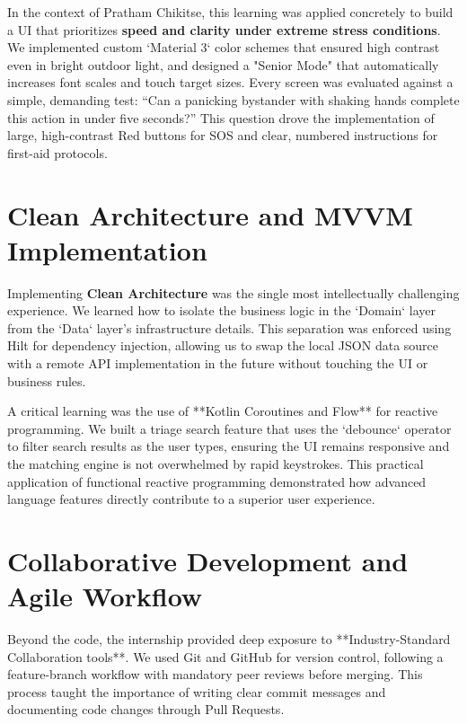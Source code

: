 \documentclass[12pt,a4paper]{report}
\begin{document}
\vspace{0.4cm}

In the context of Pratham Chikitse, this learning was applied concretely to build a UI that prioritizes \textbf{speed and clarity under extreme stress conditions}. We implemented custom `Material 3` color schemes that ensured high contrast even in bright outdoor light, and designed a "Senior Mode" that automatically increases font scales and touch target sizes. Every screen was evaluated against a simple, demanding test: ``Can a panicking bystander with shaking hands complete this action in under five seconds?'' This question drove the implementation of large, high-contrast Red buttons for SOS and clear, numbered instructions for first-aid protocols.

\section{Clean Architecture and MVVM Implementation}

Implementing \textbf{Clean Architecture} was the single most intellectually challenging experience. We learned how to isolate the business logic in the `Domain` layer from the `Data` layer's infrastructure details. This separation was enforced using Hilt for dependency injection, allowing us to swap the local JSON data source with a remote API implementation in the future without touching the UI or business rules.

\vspace{0.4cm}

A critical learning was the use of **Kotlin Coroutines and Flow** for reactive programming. We built a triage search feature that uses the `debounce` operator to filter search results as the user types, ensuring the UI remains responsive and the matching engine is not overwhelmed by rapid keystrokes. This practical application of functional reactive programming demonstrated how advanced language features directly contribute to a superior user experience.

\section{Collaborative Development and Agile Workflow}

Beyond the code, the internship provided deep exposure to **Industry-Standard Collaboration tools**. We used Git and GitHub for version control, following a feature-branch workflow with mandatory peer reviews before merging. This process taught the importance of writing clear commit messages and documenting code changes through Pull Requests.
\end{document}
